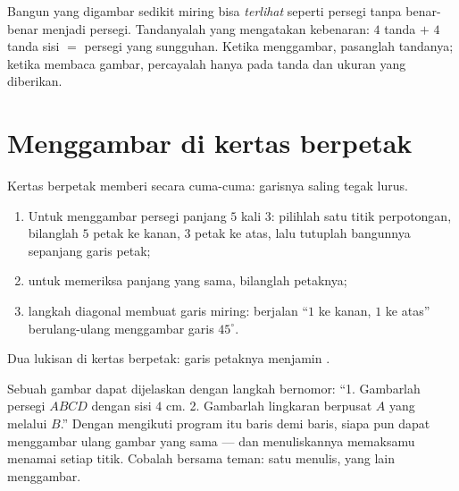 \begin{example}\label{ex:g3:shapes:marks}
Bangun yang digambar sedikit miring bisa \emph{terlihat} seperti
persegi tanpa benar-benar menjadi persegi. Tandanyalah yang
mengatakan kebenaran: $4$ tanda  $+$ $4$ tanda sisi
$=$ persegi yang sungguhan. Ketika menggambar, pasanglah tandanya;
ketika membaca gambar, percayalah hanya pada tanda dan ukuran yang
diberikan.
\end{example}

\section{Menggambar di kertas berpetak}

\begin{method}\label{met:g3:shapes:grid}
Kertas berpetak memberi  secara cuma-cuma: garisnya
saling tegak lurus.
\begin{enumerate}
  \item Untuk menggambar persegi panjang $5$ kali $3$: pilihlah satu
        titik perpotongan, bilanglah $5$ petak ke kanan, $3$ petak ke
        atas, lalu tutuplah bangunnya sepanjang garis petak;
  \item untuk memeriksa panjang yang sama, bilanglah petaknya;
  \item langkah diagonal membuat garis miring: berjalan ``$1$ ke
        kanan, $1$ ke atas'' berulang-ulang menggambar garis
        $45^\circ$.
\end{enumerate}
\end{method}

\begin{omfigure}

{\small Dua lukisan di kertas berpetak: garis petaknya menjamin
.}
\end{omfigure}

\begin{example}\label{ex:g3:shapes:program}
Sebuah gambar dapat dijelaskan dengan langkah bernomor:
``1. Gambarlah persegi $ABCD$ dengan sisi $4$ cm. 2. Gambarlah
lingkaran berpusat $A$ yang melalui $B$.'' Dengan mengikuti program
itu baris demi baris, siapa pun dapat menggambar ulang gambar yang
sama --- dan menuliskannya memaksamu menamai setiap titik. Cobalah
bersama teman: satu menulis, yang lain menggambar.
\end{example}

